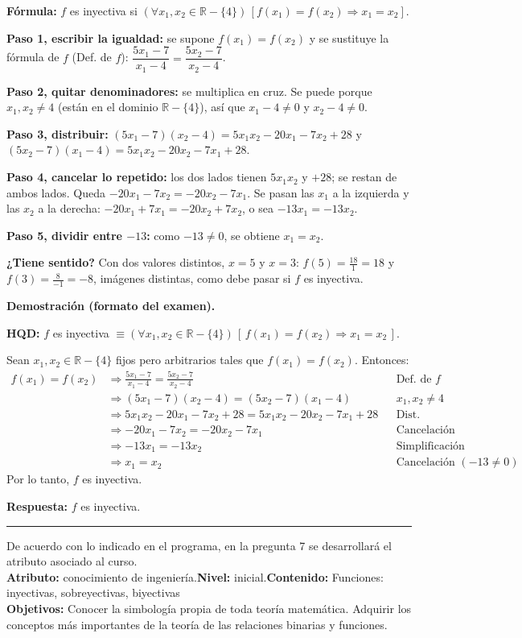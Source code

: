 \documentclass[11pt]{article}
\begin{document}
\begin{explica}
\textbf{Fórmula:} $f$ es inyectiva si $(\forall x_1,x_2\in\mathbb R-\{4\})\,[f(x_1)=f(x_2)\Rightarrow x_1=x_2]$.

\textbf{Paso 1, escribir la igualdad:} se supone $f(x_1)=f(x_2)$ y se sustituye la fórmula de $f$ (Def. de $f$): $\dfrac{5x_1-7}{x_1-4}=\dfrac{5x_2-7}{x_2-4}$.

\textbf{Paso 2, quitar denominadores:} se multiplica en cruz. Se puede porque $x_1,x_2\neq4$ (están en el dominio $\mathbb R-\{4\}$), así que $x_1-4\neq0$ y $x_2-4\neq0$.

\textbf{Paso 3, distribuir:} $(5x_1-7)(x_2-4)=5x_1x_2-20x_1-7x_2+28$ y $(5x_2-7)(x_1-4)=5x_1x_2-20x_2-7x_1+28$.

\textbf{Paso 4, cancelar lo repetido:} los dos lados tienen $5x_1x_2$ y $+28$; se restan de ambos lados. Queda $-20x_1-7x_2=-20x_2-7x_1$. Se pasan las $x_1$ a la izquierda y las $x_2$ a la derecha: $-20x_1+7x_1=-20x_2+7x_2$, o sea $-13x_1=-13x_2$.

\textbf{Paso 5, dividir entre $-13$:} como $-13\neq0$, se obtiene $x_1=x_2$.

\textbf{¿Tiene sentido?} Con dos valores distintos, $x=5$ y $x=3$: $f(5)=\frac{18}{1}=18$ y $f(3)=\frac{8}{-1}=-8$, imágenes distintas, como debe pasar si $f$ es inyectiva.
\end{explica}

\textbf{Demostración (formato del examen).}

\textbf{HQD:} $f$ es inyectiva $\equiv(\forall x_1,x_2\in\mathbb R-\{4\})\,[\,f(x_1)=f(x_2)\Rightarrow x_1=x_2\,]$.

Sean $x_1,x_2\in\mathbb R-\{4\}$ fijos pero arbitrarios tales que $f(x_1)=f(x_2)$. Entonces:
\begin{align*}
f(x_1)=f(x_2) &\Rightarrow \frac{5x_1-7}{x_1-4}=\frac{5x_2-7}{x_2-4} && \text{Def. de } f\\
&\Rightarrow (5x_1-7)(x_2-4)=(5x_2-7)(x_1-4) && x_1,x_2\neq4\\
&\Rightarrow 5x_1x_2-20x_1-7x_2+28=5x_1x_2-20x_2-7x_1+28 && \text{Dist.}\\
&\Rightarrow -20x_1-7x_2=-20x_2-7x_1 && \text{Cancelación}\\
&\Rightarrow -13x_1=-13x_2 && \text{Simplificación}\\
&\Rightarrow x_1=x_2 && \text{Cancelación } (-13\neq0)
\end{align*}
Por lo tanto, $f$ es inyectiva.

\textbf{Respuesta:} $f$ es inyectiva.

\vfill
\hrule
\smallskip
{\footnotesize De acuerdo con lo indicado en el programa, en la pregunta 7 se desarrollará el atributo asociado al curso.\\
\textbf{Atributo:} conocimiento de ingeniería.\quad \textbf{Nivel:} inicial.\quad \textbf{Contenido:} Funciones: inyectivas, sobreyectivas, biyectivas\\
\textbf{Objetivos:} Conocer la simbología propia de toda teoría matemática. Adquirir los conceptos más importantes de la teoría de las relaciones binarias y funciones.\par}
\end{document}
